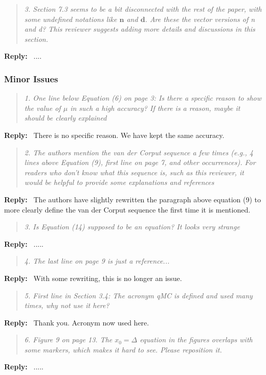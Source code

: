 \documentclass[11pt]{article}
\newenvironment{response}{%
  \vspace{1em}
  \begin{quote}\itshape
}{%
  \end{quote}
  \noindent\textbf{Reply:}~
}
\begin{document}
\begin{response}{3.}
    Section 7.3 seems to be a bit disconnected with the rest of the paper, with some undefined notations like $\boldsymbol{n}$ and $\boldsymbol{d}$. Are these the vector versions of n and d? This reviewer suggests adding more details and discussions in this section.
\end{response}
....

\subsubsection*{Minor Issues}

\begin{response}{1.}
    One line below Equation (6) on page 3: Is there a specific reason to show the value of $\mu$ in such a high accuracy? If there is a reason, maybe it should be clearly explained
\end{response}
There is no specific reason. We have kept the same accuracy.


\begin{response}{2.}
    The authors mention the van der Corput sequence a few times (e.g., 4 lines above Equation (9), first line on page 7, and other occurrences). For readers who don’t know what this sequence is, such as this reviewer, it would be helpful to provide some explanations and references
\end{response}
The authors have slightly rewritten the paragraph above equation (9) to more clearly define the van der Corput sequence the first time it is mentioned.


\begin{response}{3.}
    Is Equation (14) supposed to be an equation? It looks very strange
\end{response}
.....


\begin{response}{4.}
    The last line on page 9 is just a reference...
\end{response}
With some rewriting, this is no longer an issue.

\begin{response}{5.}
    First line in Section 3.4: The acronym qMC is defined and used many times, why not use it here?
\end{response}
    Thank you. Acronym now used here.


\begin{response}{6.}
    Figure 9 on page 13. The $x_0 = \Delta$ equation in the figures overlaps with some markers, which makes it hard to see. Please reposition it.
\end{response}
.....
\end{document}
